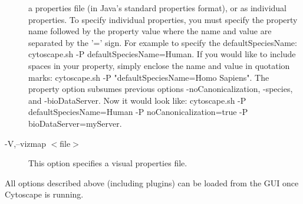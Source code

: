 \begin{description}
a properties file (in Java's standard properties format), or as individual
properties. To specify individual properties, you must specify the property name
followed by the property value where the name and value are separated by the '='
sign. For example to specify the defaultSpeciesName: cytoscape.sh -P
defaultSpeciesName=Human. If you would like to include spaces in your property,
simply enclose the name and value in quotation marks: cytoscape.sh -P
"defaultSpeciesName=Homo Sapiens". The property option subsumes previous options
-noCanonicalization, -species, and -bioDataServer. Now it would look like:
cytoscape.sh -P defaultSpeciesName=Human -P noCanonicalization=true -P
bioDataServer=myServer.
\item[-V,--vizmap $<$file$>$] This option specifies a visual properties file.
\end{description}


All options described above (including plugins) can be loaded from the GUI once
Cytoscape is running.